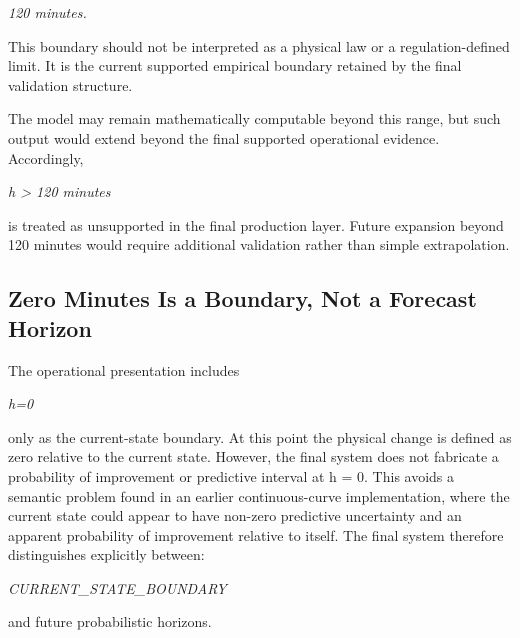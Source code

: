 \begin{center}\textit{120 minutes.}\end{center}

This boundary should not be interpreted as a physical law or a regulation-defined limit. It is the current supported empirical boundary retained by the final validation structure.

The model may remain mathematically computable beyond this range, but such output would extend beyond the final supported operational evidence. Accordingly,

\begin{center}\textit{h > 120 minutes}\end{center}

is treated as unsupported in the final production layer. Future expansion beyond 120 minutes would require additional validation rather than simple extrapolation.

\subsection{Zero Minutes Is a Boundary, Not a Forecast Horizon}
The operational presentation includes

\begin{center}\textit{h=0}\end{center}

only as the current-state boundary. At this point the physical change is defined as zero relative to the current state. However, the final system does not fabricate a probability of improvement or predictive interval at h = 0. This avoids a semantic problem found in an earlier continuous-curve implementation, where the current state could appear to have non-zero predictive uncertainty and an apparent probability of improvement relative to itself. The final system therefore distinguishes explicitly between:

\begin{center}\textit{CURRENT\_STATE\_BOUNDARY}\end{center}

and future probabilistic horizons.

